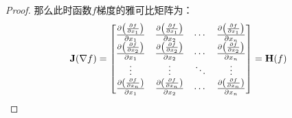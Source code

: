 \documentclass[11pt]{article}
\begin{document}
\begin{appendices}
\begin{proof}
    那么此时函数$f$梯度的雅可比矩阵为：
    \begin{equation*}
       \mathbf{J}(\nabla f) = \begin{bmatrix}
            \frac{\partial \left(\frac{\partial f}{\partial x_1}\right)}{\partial x_1} & 
            \frac{\partial \left(\frac{\partial f}{\partial x_1}\right)}{\partial x_2} & \cdots &
            \frac{\partial \left(\frac{\partial f}{\partial x_1}\right)}{\partial x_n} \\
            \frac{\partial \left(\frac{\partial f}{\partial x_2}\right)}{\partial x_1} & 
            \frac{\partial \left(\frac{\partial f}{\partial x_2}\right)}{\partial x_2} & \cdots &
            \frac{\partial \left(\frac{\partial f}{\partial x_2}\right)}{\partial x_n} \\
            \vdots & \vdots & \ddots & \vdots \\
            \frac{\partial \left(\frac{\partial f}{\partial x_n}\right)}{\partial x_1} &
            \frac{\partial \left(\frac{\partial f}{\partial x_n}\right)}{\partial x_2} & \cdots &
            \frac{\partial \left(\frac{\partial f}{\partial x_n}\right)}{\partial x_n} \\
        \end{bmatrix} = \mathbf{H}(f)
    \end{equation*}
\end{proof}

\end{appendices}
\end{document}
